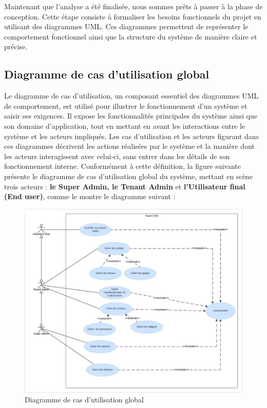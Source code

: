 \hspace{\parindent}Maintenant que l'analyse a été finalisée, nous sommes prêts à passer à la phase de conception. Cette étape consiste à formaliser les besoins fonctionnels du projet en utilisant des diagrammes UML. Ces diagrammes permettent de représenter le comportement fonctionnel ainsi que la structure du système de manière claire et précise.

\subsection{Diagramme de cas d'utilisation global}

\hspace{\parindent}Le diagramme de cas d'utilisation, un composant essentiel des diagrammes UML de comportement, est utilisé pour illustrer le fonctionnement d'un système et saisir ses exigences. Il expose les fonctionnalités principales du système ainsi que son domaine d'application, tout en mettant en avant les interactions entre le système et les acteurs impliqués. Les cas d'utilisation et les acteurs figurant dans ces diagrammes décrivent les actions réalisées par le système et la manière dont les acteurs interagissent avec celui-ci, sans entrer dans les détails de son fonctionnement interne. Conformément à cette définition, la figure suivante présente le diagramme de cas d'utilisation global du système, mettant en scène trois acteurs : \textbf{le Super Admin, le Tenant Admin} et \textbf{l'Utilisateur final (End user)}, comme le montre le diagramme suivant :




\begin{figure}[H]
  \centering
  \includegraphics[width=17cm]{Figures/use case globale.png}
  \caption{Diagramme de cas d'utilisation global}
\end{figure}





